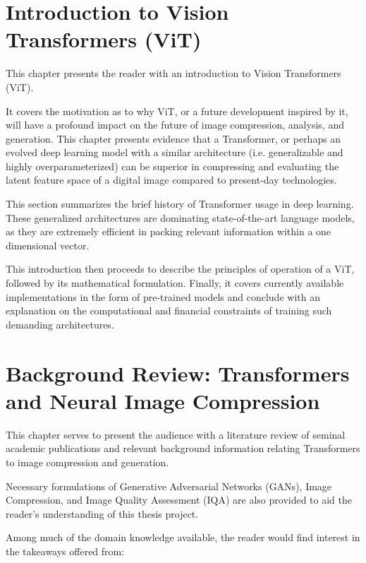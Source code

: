 \documentclass[pdftex,11pt,titlepage,twoside,openright]{report}
\begin{document}

\chapter{Introduction to Vision Transformers (ViT)}


This chapter presents the reader with an introduction to Vision Transformers (ViT).

It covers the motivation as to why ViT, or a future development inspired by it,
will have a profound impact on the future of image compression, analysis, and generation.
This chapter presents evidence that a Transformer, or perhaps an evolved deep learning model with a
similar architecture (i.e. generalizable and highly overparameterized) can be superior in
compressing and evaluating the latent feature space of a digital image compared to present-day
technologies.

This section summarizes the brief history of Transformer usage in deep learning.
These generalized architectures are dominating state-of-the-art language models,
as they are extremely efficient in packing relevant information within a one dimensional vector.

This introduction then proceeds to describe the principles of operation of a ViT, 
followed by its mathematical formulation. Finally, it covers currently 
available implementations in the form of pre-trained models and conclude with an 
explanation on the computational and financial constraints of training such demanding 
architectures.

\ThinHRule

\newpage



\chapter{Background Review: Transformers and Neural Image Compression}


This chapter serves to present the audience with a literature review of seminal academic
publications and relevant background information relating Transformers to image 
compression and generation.

Necessary formulations of Generative Adversarial Networks (GANs),
Image Compression, and Image Quality Assessment (IQA)
are also provided to aid the reader's understanding of this thesis project.

Among much of the domain knowledge available, the reader would find interest in the 
takeaways offered from:
\end{document}
